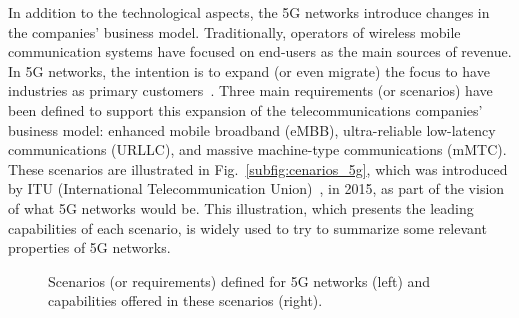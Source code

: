 In addition to the technological aspects, the 5G networks introduce changes in the companies' business model. Traditionally, operators of wireless mobile communication systems have focused on end-users as the main sources of revenue. In 5G networks, the intention is to expand (or even migrate) the focus to have industries as primary customers~\cite{palattella:16,lema:17}. Three main requirements (or scenarios) have been defined to support this expansion of the telecommunications companies' business model: enhanced mobile broadband (eMBB), ultra-reliable low-latency communications (URLLC), and massive machine-type communications (mMTC). These scenarios are illustrated in Fig.~\ref{subfig:cenarios_5g}, which was introduced by ITU (International Telecommunication Union)~\cite{itu:15}, in 2015, as part of the vision of what 5G networks would be. This illustration, which presents the leading capabilities of each scenario, is widely used to try to summarize some relevant properties of 5G networks.

\begin{figure}[htb]
\centering
    \hfil
    \caption{Scenarios (or requirements) defined for 5G networks (left) and capabilities offered in these scenarios (right).}
\label{fig:redes_5g}
\end{figure}

